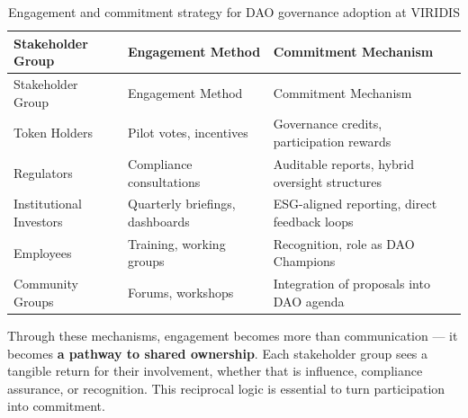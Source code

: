 \documentclass[
  english,
  12pt,
  oneside,
  open=any]{scrbook}
\begin{document}
\begin{longtable}[]{@{}
  >{\raggedright\arraybackslash}p{}
  >{\raggedright\arraybackslash}p{}
  >{\raggedright\arraybackslash}p{}@{}}
\caption{Engagement and commitment strategy for DAO governance adoption
at VIRIDIS}\label{tbl-engagement}\tabularnewline
\toprule\noalign{}
\begin{minipage}[b]{\linewidth}\raggedright
Stakeholder Group
\end{minipage} & \begin{minipage}[b]{\linewidth}\raggedright
Engagement Method
\end{minipage} & \begin{minipage}[b]{\linewidth}\raggedright
Commitment Mechanism
\end{minipage} \\
\midrule\noalign{}
\endfirsthead
\toprule\noalign{}
\begin{minipage}[b]{\linewidth}\raggedright
Stakeholder Group
\end{minipage} & \begin{minipage}[b]{\linewidth}\raggedright
Engagement Method
\end{minipage} & \begin{minipage}[b]{\linewidth}\raggedright
Commitment Mechanism
\end{minipage} \\
\midrule\noalign{}
\endhead
\bottomrule\noalign{}
\endlastfoot
Token Holders & Pilot votes, incentives & Governance credits,
participation rewards \\
Regulators & Compliance consultations & Auditable reports, hybrid
oversight structures \\
Institutional Investors & Quarterly briefings, dashboards & ESG-aligned
reporting, direct feedback loops \\
Employees & Training, working groups & Recognition, role as DAO
Champions \\
Community Groups & Forums, workshops & Integration of proposals into DAO
agenda \\
\end{longtable}

Through these mechanisms, engagement becomes more than communication ---
it becomes \textbf{a pathway to shared ownership}. Each stakeholder
group sees a tangible return for their involvement, whether that is
influence, compliance assurance, or recognition. This reciprocal logic
is essential to turn participation into commitment.
\end{document}
